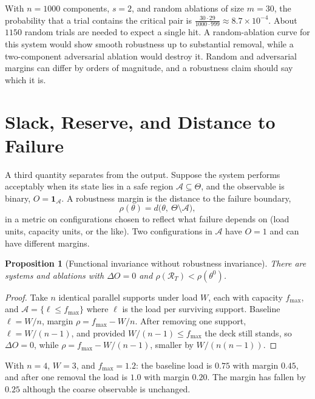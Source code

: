 \documentclass[11pt]{article}
\newtheorem{proposition}[theorem]{Proposition}
\theoremstyle{definition}
\theoremstyle{remark}
\newcommand{\Rop}{\mathcal{R}}
\newcommand{\ind}{\mathbf{1}}
\begin{document}
With $n=1000$ components, $s=2$, and random ablations of size $m=30$, the probability that a trial contains the critical pair is $\frac{30\cdot29}{1000\cdot999}\approx 8.7\times10^{-4}$. About $1150$ random trials are needed to expect a single hit. A random-ablation curve for this system would show smooth robustness up to substantial removal, while a two-component adversarial ablation would destroy it. Random and adversarial margins can differ by orders of magnitude, and a robustness claim should say which it is.

\section{Slack, Reserve, and Distance to Failure}\label{sec:slack}

A third quantity separates from the output. Suppose the system performs acceptably when its state lies in a safe region $\mathcal A\subseteq\Theta$, and the observable is binary, $O=\ind_{\mathcal A}$. A robustness margin is the distance to the failure boundary,
\[
\rho(\theta)=d\bigl(\theta,\ \Theta\setminus\mathcal A\bigr),
\]
in a metric on configurations chosen to reflect what failure depends on (load units, capacity units, or the like). Two configurations in $\mathcal A$ have $O=1$ and can have different margins.

\begin{proposition}[Functional invariance without robustness invariance]\label{prop:margin2}
There are systems and ablations with $\Delta O=0$ and $\rho(\Rop_T)<\rho(\theta^0)$.
\end{proposition}
\begin{proof}
Take $n$ identical parallel supports under load $W$, each with capacity $f_{\max}$, and $\mathcal A=\{\ell\le f_{\max}\}$ where $\ell$ is the load per surviving support. Baseline $\ell=W/n$, margin $\rho=f_{\max}-W/n$. After removing one support, $\ell=W/(n-1)$, and provided $W/(n-1)\le f_{\max}$ the deck still stands, so $\Delta O=0$, while $\rho=f_{\max}-W/(n-1)$, smaller by $W/(n(n-1))$.
\end{proof}

With $n=4$, $W=3$, and $f_{\max}=1.2$: the baseline load is $0.75$ with margin $0.45$, and after one removal the load is $1.0$ with margin $0.20$. The margin has fallen by $0.25$ although the coarse observable is unchanged.
\end{document}
